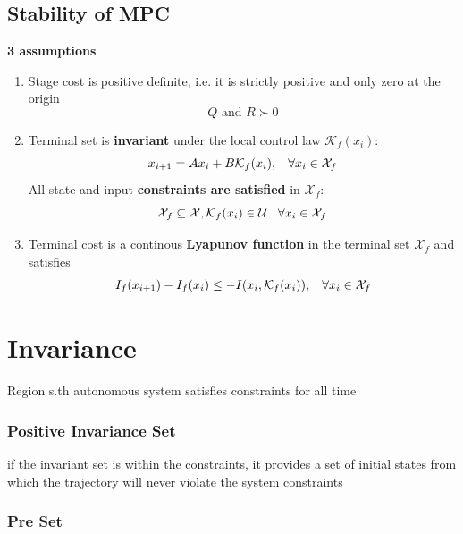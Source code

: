 \subsection{Stability of MPC}
\textbf{3 assumptions}
\begin{enumerate}
    \item Stage cost is positive definite, i.e. it is strictly positive and only zero at the origin
    \[Q \textrm{ and } R \succ 0\]
    \item Terminal set is \textbf{invariant} under the local control law $\mathcal{K}_f(x_i)$:\[x_{i+1} = Ax_i+B\mathcal{K}_f(x_i), \hspace{3mm} \forall x_i \in \mathcal{X}_f\]
    All state and input \textbf{constraints are satisfied} in $\mathcal{X}_f$:
    \[\mathcal{X}_f \subseteq \mathcal{X}, \mathcal{K}_f (x_i) \in \mathcal{U} \hspace{3mm} \forall x_i \in \mathcal{X}_f\]
    \item Terminal cost is a continous \textbf{Lyapunov function} in the terminal set $\mathcal{X}_f$ and satisfies \[I_f(x_{i+1}) - I_f(x_i) \leq -I(x_i,\mathcal{K}_f(x_i)), \hspace{3mm} \forall x_i \in \mathcal{X}_f\]
\end{enumerate}
\section{Invariance}
Region s.th autonomous system satisfies constraints for all time 
\subsubsection{Positive Invariance Set}
if the invariant set is within the constraints, it provides a set of initial states from which the trajectory will never violate the system constraints
\subsubsection{Pre Set}
